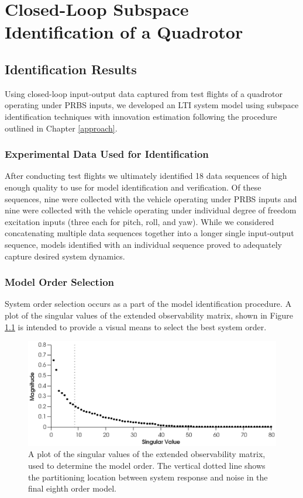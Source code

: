 \chapter{Closed-Loop Subspace Identification of a Quadrotor}\label{results}
\section{Identification Results}
Using closed-loop input-output data captured from test flights of a quadrotor operating under PRBS inputs, we developed an LTI system model using subspace identification techniques with innovation estimation following the procedure outlined in Chapter \ref{approach}.

\subsection{Experimental Data Used for Identification}
After conducting test flights we ultimately identified 18 data sequences of high enough quality to use for model identification and verification. Of these sequences, nine were collected with the vehicle operating under PRBS inputs and nine were collected with the vehicle operating under individual degree of freedom  excitation inputs (three each for pitch, roll, and yaw). While we considered concatenating multiple data sequences together into a longer single input-output sequence, models identified with an individual sequence proved to adequately capture desired system dynamics.


\subsection{Model Order Selection}
System order selection occurs as a part of the model identification procedure. A plot of the singular values of the extended observability matrix, shown in Figure \ref{singular_values} is intended to provide a visual means to select the best system order. 
\begin{figure}[hbt!]
	\centering
	\includegraphics{../fig/singular_values_parsim.eps}
	\caption{A plot of the singular values of the extended observability matrix, used to determine the model order. The vertical dotted line shows the partitioning location between system response and noise in the final eighth order model.}
	\label{singular_values}
\end{figure}

